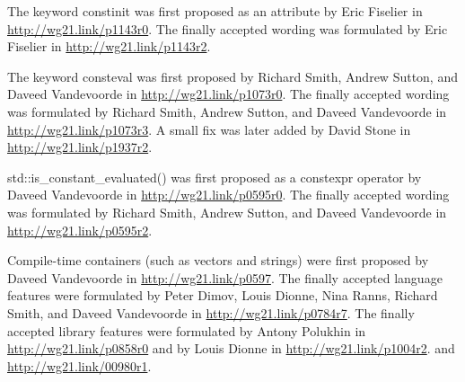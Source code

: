 The keyword constinit was first proposed as an attribute by Eric Fiselier in \url{http://wg21.link/p1143r0}. The finally accepted wording was formulated by Eric Fiselier in \url{http://wg21.link/p1143r2}.

The keyword consteval was first proposed by Richard Smith, Andrew Sutton, and Daveed Vandevoorde in \url{http://wg21.link/p1073r0}. The finally accepted wording was formulated by Richard Smith, Andrew Sutton, and Daveed Vandevoorde in \url{http://wg21.link/p1073r3}. A small fix was later added by David Stone in \url{http://wg21.link/p1937r2}.

std::is\_constant\_evaluated() was first proposed as a constexpr operator by Daveed Vandevoorde in \url{http://wg21.link/p0595r0}. The finally accepted wording was formulated by Richard Smith, Andrew Sutton, and Daveed Vandevoorde in \url{http://wg21.link/p0595r2}.

Compile-time containers (such as vectors and strings) were first proposed by Daveed Vandevoorde in \url{http://wg21.link/p0597}. The finally accepted language features were formulated by Peter Dimov, Louis Dionne, Nina Ranns, Richard Smith, and Daveed Vandevoorde in \url{http://wg21.link/p0784r7}. The finally accepted library features were formulated by Antony Polukhin in \url{http://wg21.link/p0858r0} and by Louis Dionne in \url{http://wg21.link/p1004r2}. and \url{http://wg21.link/00980r1}.
